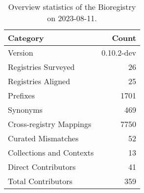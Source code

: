 \begin{table}
\caption{Overview statistics of the Bioregistry on 2023-08-11.}
\label{tab:bioregistry-summary}
\begin{tabular}{lr}
\toprule
Category & Count \\
\midrule
Version & 0.10.2-dev \\
Registries Surveyed & 26 \\
Registries Aligned & 25 \\
Prefixes & 1701 \\
Synonyms & 469 \\
Cross-registry Mappings & 7750 \\
Curated Mismatches & 52 \\
Collections and Contexts & 13 \\
Direct Contributors & 41 \\
Total Contributors & 359 \\
\bottomrule
\end{tabular}
\end{table}
